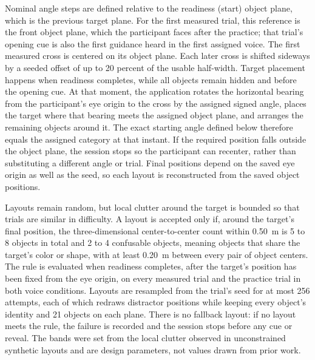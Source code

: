 \clearpage
Nominal angle steps are defined relative to the readiness (start) object plane, which is the previous target plane. For the first measured trial, this reference is the front object plane, which the participant faces after the practice; that trial's opening cue is also the first guidance heard in the first assigned voice. The first measured cross is centered on its object plane. Each later cross is shifted sideways by a seeded offset of up to 20 percent of the usable half-width. Target placement happens when readiness completes, while all objects remain hidden and before the opening cue. At that moment, the application rotates the horizontal bearing from the participant's eye origin to the cross by the assigned signed angle, places the target where that bearing meets the assigned object plane, and arranges the remaining objects around it. The exact starting angle defined below therefore equals the assigned category at that instant. If the required position falls outside the object plane, the session stops so the participant can recenter, rather than substituting a different angle or trial. Final positions depend on the saved eye origin as well as the seed, so each layout is reconstructed from the saved object positions.

Layouts remain random, but local clutter around the target is bounded so that trials are similar in difficulty. A layout is accepted only if, around the target's final position, the three-dimensional center-to-center count within 0.50~m is 5 to 8 objects in total and 2 to 4 confusable objects, meaning objects that share the target's color or shape, with at least 0.20~m between every pair of object centers. The rule is evaluated when readiness completes, after the target's position has been fixed from the eye origin, on every measured trial and the practice trial in both voice conditions. Layouts are resampled from the trial's seed for at most 256 attempts, each of which redraws distractor positions while keeping every object's identity and 21 objects on each plane. There is no fallback layout: if no layout meets the rule, the failure is recorded and the session stops before any cue or reveal. The bands were set from the local clutter observed in unconstrained synthetic layouts and are design parameters, not values drawn from prior work.

